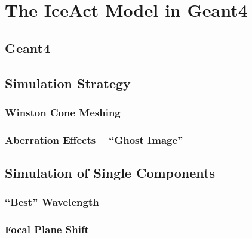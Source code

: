 \chapter{The IceAct Model in Geant4}

\section{Geant4}

\section{Simulation Strategy}

\subsection{Winston Cone Meshing}

\subsection{Aberration Effects -- \enquote{Ghost Image}}

\section{Simulation of Single Components}

\subsection{\enquote{Best} Wavelength}

\subsection{Focal Plane Shift}
